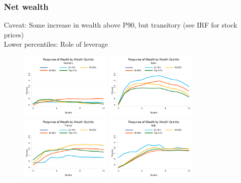 \documentclass[pdflatex,aspectratio=169]{beamer}
\begin{document}
\begin{frame}\frametitle{\bf Net wealth}

{\scriptsize Caveat:  Some increase in wealth above P90, but transitory (see IRF for stock prices)\\
Lower percentiles: Role of leverage}
\begin{figure}
\begin{center}
\includegraphics[width=0.40\textwidth]{./figures/dn3001_chart_DE}
\includegraphics[width=0.40\textwidth]{./figures/dn3001_chart_ES}\\
\includegraphics[width=0.40\textwidth]{./figures/dn3001_chart_FR}
\includegraphics[width=0.40\textwidth]{./figures/dn3001_chart_IT}
\end{center}
\end{figure}
\end{frame}
\end{document}
